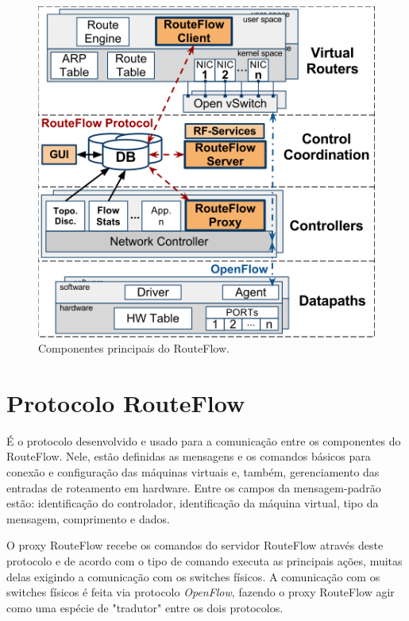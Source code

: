 \begin{figure}[h] 
\centering
\includegraphics[width=150mm]{componentesRouteFlow.png}
\caption{Componentes principais do RouteFlow.}
\label{fig:componentesRouteFlow} 
\end{figure}

\section{Protocolo RouteFlow}

É o protocolo desenvolvido e usado para a comunicação entre
os componentes do RouteFlow. Nele, estão definidas as
mensagens e os comandos básicos para conexão e configuração
das máquinas virtuais e, também, gerenciamento das entradas
de roteamento em hardware. Entre os campos da
mensagem-padrão estão: identificação do controlador,
identificação da máquina virtual, tipo da mensagem,
comprimento e dados. 

O proxy RouteFlow recebe os comandos do
servidor RouteFlow através deste protocolo e de acordo com o
tipo de comando executa as principais ações, muitas delas
exigindo a comunicação com os switches físicos. A
comunicação com os switches físicos é feita via protocolo
\textit{OpenFlow}, fazendo o proxy RouteFlow agir como
uma espécie de "tradutor" entre os dois protocolos.
